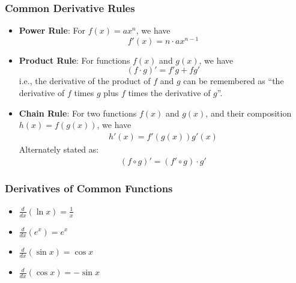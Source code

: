 \documentclass[10pt,a4paper]{article}
\begin{document}
\subsubsection*{Common Derivative Rules}
\begin{itemize}
    \item \textbf{Power Rule}: For $f(x) = ax^n$, we have $$f'(x) = n \cdot a x^{n-1}$$
    \item \textbf{Product Rule}: For functions $f(x)$ and $g(x)$, we have $$(f \cdot g)' = f'g + fg'$$ i.e., the derivative of the product of $f$ and $g$ can be remembered as ``the derivative of $f$ times $g$ plus $f$ times the derivative of $g$''.
    \item \textbf{Chain Rule}: For two functions $f(x)$ and $g(x)$, and their composition $h(x) = f(g(x))$, we have 
    \begin{align*}
        h'(x) = f'(g(x))g'(x)
    \end{align*}  
    Alternately stated as:
    \begin{align*}
        (f \circ g)' = (f' \circ g) \cdot g' 
    \end{align*}
\end{itemize}

\subsubsection*{Derivatives of Common Functions}
\begin{itemize}
    \item $\frac{d}{dx} (\ln{x}) = \frac{1}{x}$
    \item $\frac{d}{dx} (e^{x}) = {e}^{x}$
    \item $\frac{d}{dx} (\sin{x}) = \cos{x}$
    \item $\frac{d}{dx} (\cos{x}) = -\sin{x}$
\end{itemize}
 
\end{document}
